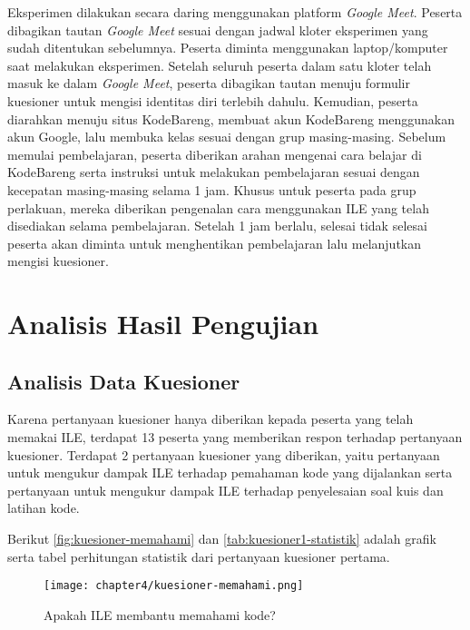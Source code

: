 Eksperimen dilakukan secara daring menggunakan platform \textit{Google Meet}. Peserta dibagikan tautan \textit{Google Meet} sesuai dengan jadwal kloter eksperimen yang sudah ditentukan sebelumnya. Peserta diminta menggunakan laptop/komputer saat melakukan eksperimen. Setelah seluruh peserta dalam satu kloter telah masuk ke dalam \textit{Google Meet}, peserta dibagikan tautan menuju formulir kuesioner untuk mengisi identitas diri terlebih dahulu. Kemudian, peserta diarahkan menuju situs KodeBareng, membuat akun KodeBareng menggunakan akun Google, lalu membuka kelas sesuai dengan grup masing-masing. Sebelum memulai pembelajaran, peserta diberikan arahan mengenai cara belajar di KodeBareng serta instruksi untuk melakukan pembelajaran sesuai dengan kecepatan masing-masing selama 1 jam. Khusus untuk peserta pada grup perlakuan, mereka diberikan pengenalan cara menggunakan ILE yang telah disediakan selama pembelajaran. Setelah 1 jam berlalu, selesai tidak selesai peserta akan diminta untuk menghentikan pembelajaran lalu melanjutkan mengisi kuesioner.

\section{Analisis Hasil Pengujian} \label{sec:analisis-hasil-pengujian}

\subsection{Analisis Data Kuesioner}
Karena pertanyaan kuesioner hanya diberikan kepada peserta yang telah memakai ILE, terdapat 13 peserta yang memberikan respon terhadap pertanyaan kuesioner. Terdapat 2 pertanyaan kuesioner yang diberikan, yaitu pertanyaan untuk mengukur dampak ILE terhadap pemahaman kode yang dijalankan serta pertanyaan untuk mengukur dampak ILE terhadap penyelesaian soal kuis dan latihan kode.

Berikut \autoref{fig:kuesioner-memahami} dan \autoref{tab:kuesioner1-statistik} adalah grafik serta tabel perhitungan statistik dari pertanyaan kuesioner pertama.

\begin{figure}[H]
  \centering
  \texttt{[image: chapter4/kuesioner-memahami.png]}
  \caption{Apakah ILE membantu memahami kode?} \label{fig:kuesioner-memahami}
\end{figure}

